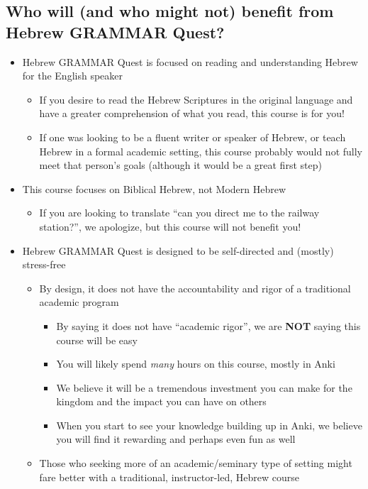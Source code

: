 \documentclass[
]{turabian-researchpaper}
\providecommand{\tightlist}{%
  \setlength{\itemsep}{0pt}\setlength{\parskip}{0pt}}
\begin{document}
\hypertarget{who-will-and-who-might-not-benefit-from-hebrew-grammar-quest}{%
\subsection*{Who will (and who might not) benefit from Hebrew GRAMMAR Quest?}\label{who-will-and-who-might-not-benefit-from-hebrew-grammar-quest}}

\begin{itemize}
\tightlist
\item
  Hebrew GRAMMAR Quest is focused on reading and understanding Hebrew for the English speaker

  \begin{itemize}
  \tightlist
  \item
    If you desire to read the Hebrew Scriptures in the original language and have a greater comprehension of what you read, this course is for you!
  \item
    If one was looking to be a fluent writer or speaker of Hebrew, or teach Hebrew in a formal academic setting, this course probably would not fully meet that person's goals (although it would be a great first step)
  \end{itemize}
\item
  This course focuses on Biblical Hebrew, not Modern Hebrew

  \begin{itemize}
  \tightlist
  \item
    If you are looking to translate ``can you direct me to the railway station?'', we apologize, but this course will not benefit you!
  \end{itemize}
\item
  Hebrew GRAMMAR Quest is designed to be self-directed and (mostly) stress-free

  \begin{itemize}
  \tightlist
  \item
    By design, it does not have the accountability and rigor of a traditional academic program

    \begin{itemize}
    \tightlist
    \item
      By saying it does not have ``academic rigor'', we are \textbf{NOT} saying this course will be easy
    \item
      You will likely spend \emph{many} hours on this course, mostly in Anki
    \item
      We believe it will be a tremendous investment you can make for the kingdom and the impact you can have on others
    \item
      When you start to see your knowledge building up in Anki, we believe you will find it rewarding and perhaps even fun as well
    \end{itemize}
  \item
    Those who seeking more of an academic/seminary type of setting might fare better with a traditional, instructor-led, Hebrew course
  \end{itemize}
\end{itemize}
\end{document}
